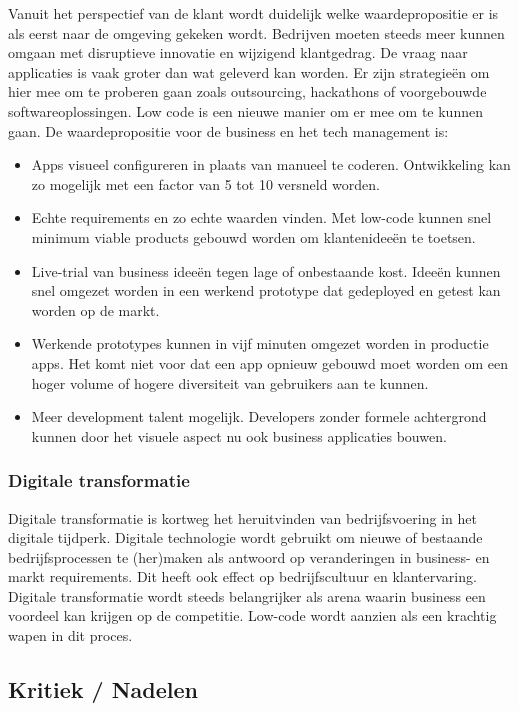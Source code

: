 Vanuit het perspectief van de klant wordt duidelijk welke waardepropositie er is als eerst naar de omgeving gekeken wordt. Bedrijven moeten steeds meer kunnen omgaan met disruptieve innovatie en wijzigend klantgedrag. De vraag naar applicaties is vaak groter dan wat geleverd kan worden. Er zijn strategieën om hier mee om te proberen gaan zoals outsourcing, hackathons of voorgebouwde softwareoplossingen. Low code is een nieuwe manier om er mee om te kunnen gaan. De waardepropositie voor de business en het tech management is:
\begin{itemize}
    \item Apps visueel configureren in plaats van manueel te coderen. Ontwikkeling kan zo mogelijk met een factor van 5 tot 10 versneld worden.
    \item Echte requirements en zo echte waarden vinden. Met low-code kunnen snel minimum viable products gebouwd worden om klantenideeën te toetsen.
    \item Live-trial van business ideeën tegen lage of onbestaande kost. Ideeën kunnen snel omgezet worden in een werkend prototype dat gedeployed en getest kan worden op de markt.
    \item Werkende prototypes kunnen in vijf minuten omgezet worden in productie apps. Het komt niet voor dat een app opnieuw gebouwd moet worden om een hoger volume of hogere diversiteit van gebruikers aan te kunnen.
    \item Meer development talent mogelijk. Developers zonder formele achtergrond kunnen door het visuele aspect nu ook business applicaties bouwen.
\end{itemize} \autocite{Richardson2016}

\subsubsection{Digitale transformatie}

Digitale transformatie is kortweg het heruitvinden van bedrijfsvoering in het digitale tijdperk. Digitale technologie wordt gebruikt om nieuwe of bestaande bedrijfsprocessen te (her)maken als antwoord op veranderingen in business- en markt requirements. Dit heeft ook effect op bedrijfscultuur en klantervaring. \autocite{Salesforce}\\
Digitale transformatie wordt steeds belangrijker als arena waarin business een voordeel kan krijgen op de competitie. Low-code wordt aanzien als een krachtig wapen in dit proces.

\subsection{Kritiek / Nadelen}

